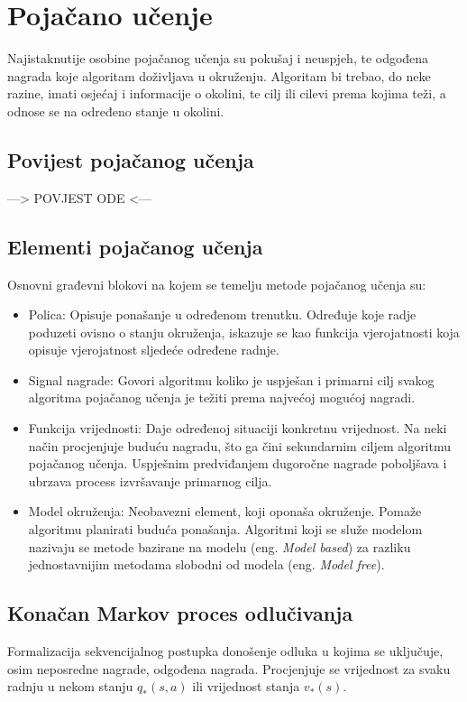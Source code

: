 \section{Pojačano učenje}
Najistaknutije osobine pojačanog učenja su pokušaj i neuspjeh, te odgođena nagrada koje algoritam doživljava u okruženju. Algoritam bi trebao, do neke razine, imati osjećaj i informacije o okolini, te cilj ili cilevi prema kojima teži, a odnose se na određeno stanje u okolini.

\subsection{Povijest pojačanog učenja}
---> POVJEST ODE <---

\subsection{Elementi pojačanog učenja}
Osnovni građevni blokovi na kojem se temelju metode pojačanog učenja su:
\begin{itemize}
	\item Polica: Opisuje ponašanje u određenom trenutku. Određuje koje radje poduzeti ovisno o stanju okruženja, iskazuje se kao funkcija vjerojatnosti koja opisuje vjerojatnost sljedeće određene radnje.
	
	\item Signal nagrade: Govori algoritmu koliko je uspješan i primarni cilj svakog algoritma pojačanog učenja je težiti prema najvećoj mogućoj nagradi. 
	
	\item Funkcija vrijednosti: Daje određenoj situaciji konkretnu vrijednost. Na neki način procjenjuje buduću nagradu, što ga čini sekundarnim ciljem algoritmu pojačanog učenja. Uspješnim predviđanjem dugoročne nagrade poboljšava i ubrzava process izvršavanje primarnog cilja. 
	
	\item Model okruženja: Neobavezni element, koji oponaša okruženje. Pomaže algoritmu planirati buduća ponašanja. Algoritmi koji se služe modelom nazivaju se metode bazirane na modelu (eng. \textit{Model based}) za razliku jednostavnijim metodama slobodni od modela (eng. \textit{Model free}).
\end{itemize}

\subsection{Konačan Markov proces odlučivanja}
Formalizacija sekvencijalnog postupka donošenje odluka u kojima se uključuje, osim neposredne nagrade, odgođena nagrada. Procjenjuje se vrijednost za svaku radnju u nekom stanju $q_*(s,a)$ ili vrijednost stanja $v_*(s)$. 

